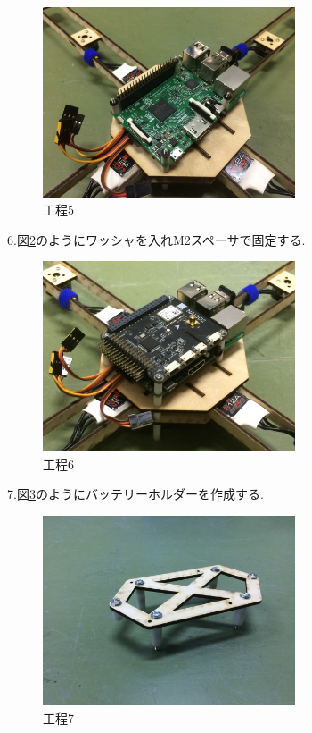 \documentclass[12pt,oneside]{sotsuken_paper}
\begin{document}
\begin{figure}[htbp]
	\begin{center}
		\includegraphics[width=75mm]{image/kitai/kitai3.jpg}
		\caption{工程5}
		\label{fig:kitai3}
	\end{center}
\end{figure}


6.図\ref{fig:kitai4}のようにワッシャを入れM2スペーサで固定する.

\begin{figure}[htbp]
	\begin{center}
		\includegraphics[width=75mm]{image/kitai/kitai4.jpg}
		\caption{工程6}
		\label{fig:kitai4}
	\end{center}
\end{figure}


7.図\ref{fig:kitai5}のようにバッテリーホルダーを作成する.

\begin{figure}[htbp]
	\begin{center}
		\includegraphics[width=75mm]{image/kitai/kitai5.jpg}
		\caption{工程7}
		\label{fig:kitai5}
	\end{center}
\end{figure}
\end{document}
